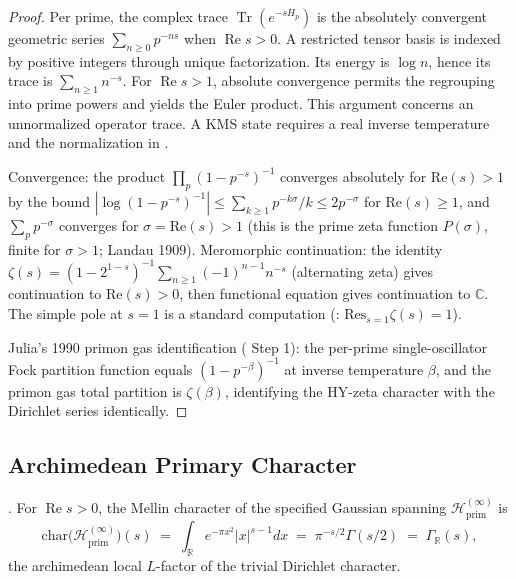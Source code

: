 \begin{proof}
Per prime, the complex trace $\operatorname{Tr}(e^{-sH_p})$
is the absolutely convergent geometric series
$\sum_{n\geq0}p^{-ns}$ when $\operatorname{Re}s>0$.
A restricted tensor basis is indexed by positive integers through
unique factorization. Its energy is $\log n$, hence its trace is
$\sum_{n\geq1}n^{-s}$. For $\operatorname{Re}s>1$, absolute
convergence permits the regrouping into prime powers and yields
the Euler product. This argument concerns an unnormalized operator
trace. A KMS state requires a real inverse temperature and the
normalization in .

Convergence: the product \(\prod_p(1-p^{-s})^{-1}\) converges absolutely for
\(\mathrm{Re}(s)>1\) by the bound \(|\log(1-p^{-s})^{-1}|\leq\sum_{k\geq 1}p^{-k\sigma}/k\leq 2p^{-\sigma}\)
for \(\mathrm{Re}(s)\geq 1\), and \(\sum_p p^{-\sigma}\) converges for
\(\sigma=\mathrm{Re}(s)>1\) (this is the prime zeta function \(P(\sigma)\),
finite for \(\sigma>1\); Landau 1909). Meromorphic continuation: the identity
\(\zeta(s)=(1-2^{1-s})^{-1}\sum_{n\geq 1}(-1)^{n-1}n^{-s}\)
(alternating zeta) gives continuation to \(\mathrm{Re}(s)>0\), then
functional equation gives continuation to \(\mathbb{C}\). The simple
pole at \(s=1\) is a standard computation
(: \(\mathrm{Res}_{s=1}\zeta(s)=1\)).

Julia's 1990 primon gas identification
( Step 1): the per-prime
single-oscillator Fock partition function equals
\((1-p^{-\beta})^{-1}\) at inverse temperature \(\beta\), and the
primon gas total partition is \(\zeta(\beta)\), identifying the
HY-zeta character with the Dirichlet series identically.
\end{proof}

\subsection{Archimedean Primary Character}
\label{v4-arith:prim-zeta:arch-char}

\begin{theorem}
\label{v4-arith:prim-zeta:thm:arch-char}
\ClaimStatusProvedHere. For \(\operatorname{Re}s>0\), the Mellin character of the specified
Gaussian spanning \(\mathcal{H}^{(\infty)}_{\mathrm{prim}}\) is
\begin{equation}
\label{v4-arith:prim-zeta:eq:full-arch-char}
\mathrm{char}\bigl(\mathcal{H}^{(\infty)}_{\mathrm{prim}}\bigr)(s)
\;=\;\int_{\mathbb{R}}e^{-\pi x^{2}}|x|^{s-1}dx
\;=\;\pi^{-s/2}\Gamma(s/2)
\;=\;\Gamma_{\mathbb{R}}(s),
\end{equation}
the archimedean local \(L\)-factor of the trivial Dirichlet character.
\end{theorem}

